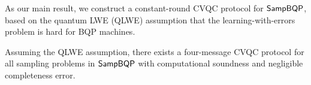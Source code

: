 

As our main result, we construct a constant-round CVQC protocol for $\operatorname{\mathsf{SampBQP}}$, based on the quantum LWE (QLWE) assumption that the learning-with-errors problem is hard for BQP machines. 
\begin{theorem}[informal] \label{thm:qpip0-informal}
Assuming the QLWE assumption, there exists a four-message CVQC protocol for all sampling problems in $\operatorname{\mathsf{SampBQP}}$ with computational soundness and negligible completeness error.
\end{theorem}












